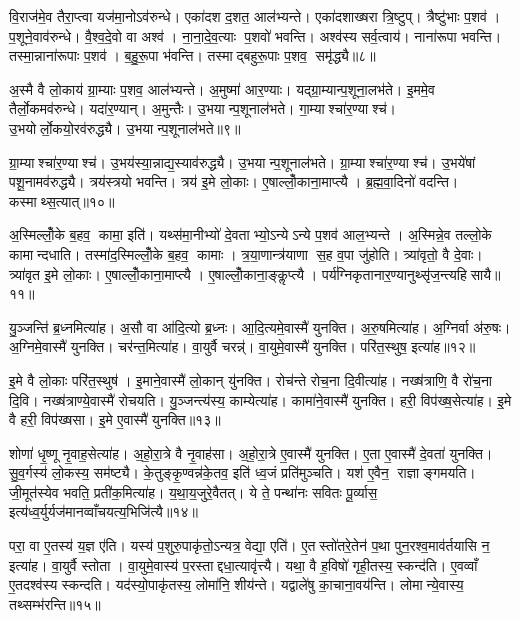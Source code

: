 वि॒राज॑मे॒व तैरा॒प्त्वा यज॑मा॒नोऽव॑रुन्धे। एका॑दश द॒शत॒ आल॑भ्यन्ते। एका॑दशाख्षरा त्रि॒ष्टुप्। त्रैष्टु॑भाः प॒शव॑। प॒शूने॒वाव॑रुन्धे। वै॒श्व॒दे॒वो वा अश्व॑। ना॒ना॒दे॒व॒त्याः प॒शवो॑ भवन्ति। अश्व॑स्य सर्व॒त्वाय॑। नाना॑रूपा भवन्ति। तस्मा॒न्नाना॑रूपाः प॒शव॑। ब॒हु॒रू॒पा भ॑वन्ति। तस्माद्बहुरू॒पाः प॒शव॒ समृ॑द्ध्यै॥८॥\anuvakamend[आ॒र॒ण्याल्लोँ॒को द॒शिन॑ आल॒भ्यन्ते॒ नाना॑रूपाः प॒शवो॒ द्वे च॑]

अ॒स्मै वै लो॒काय॑ ग्रा॒म्याः प॒शव॒ आल॑भ्यन्ते। अ॒मुष्मा॑ आर॒ण्याः। यद्ग्रा॒म्यान्प॒शूना॒लभ॑ते। इ॒ममे॒व तैर्लो॒कमव॑रुन्धे। यदा॑र॒ण्यान्। अ॒मुन्तैः। उ॒भयान्प॒शूनाल॑भते। गा॒म्याश्चा॑र॒ण्याश्च॑। उ॒भयोर्लो॒कयो॒रव॑रुद्ध्यै। उ॒भयान्प॒शूनाल॑भते॥९॥

ग्रा॒म्याश्चा॑र॒ण्याश्च॑। उ॒भय॑स्या॒न्नाद्य॒स्याव॑रुद्ध्यै। उ॒भयान्प॒शूनाल॑भते। ग्रा॒म्याश्चा॑र॒ण्याश्च॑। उ॒भये॑षां पशू॒नामव॑रुद्ध्यै। त्रय॑स्त्रयो भवन्ति। त्रय॑ इ॒मे लो॒काः। ए॒षाल्लोँ॒काना॒माप्त्यै। ब्र॒ह्म॒वा॒दिनो॑ वदन्ति। कस्माथ्स॒त्यात्॥१०॥

अ॒स्मिल्लोँ॒के ब॒हव॒ कामा॒ इति॑। यथ्स॑मा॒नीभ्यो॑ दे॒वताभ्यो॒ऽन्येऽन्ये प॒शव॑ आल॒भ्यन्ते। अ॒स्मिन्ने॒व तल्लो॒के कामान्दधाति। तस्मा॑द॒स्मिल्लोँ॒के ब॒हव॒ कामाः। त्र॒या॒णान्त्र॑याणा स॒ह व॒पा जु॑होति। त्र्या॑वृतो॒ वै दे॒वाः। त्र्या॑वृत इ॒मे लो॒काः। ए॒षाल्लोँ॒काना॒माप्त्यै। ए॒षाल्लोँ॒काना॒ङ्कॢप्त्यै। पर्य॑ग्निकृतानार॒ण्यानुथ्सृ॑ज॒न्त्यहिसायै॥११॥\anuvakamend[अव॑रुद्ध्या उ॒भयान्प॒शूनाल॑भते स॒त्यादहिसायै]

यु॒ञ्जन्ति॑ ब्र॒ध्नमित्या॑ह। अ॒सौ वा आ॑दि॒त्यो ब्र॒ध्नः। आ॒दि॒त्यमे॒वास्मै॑ युनक्ति। अ॒रु॒षमित्या॑ह। अ॒ग्निर्वा अ॑रु॒षः। अ॒ग्निमे॒वास्मै॑ युनक्ति। चर॑न्त॒मित्या॑ह। वा॒युर्वै चरन्न्॑। वा॒युमे॒वास्मै॑ युनक्ति। परि॑त॒स्थुष॒ इत्या॑ह॥१२॥

इ॒मे वै लो॒काः परि॑त॒स्थुष॑। इ॒माने॒वास्मै॑ लो॒कान् यु॑नक्ति। रोच॑न्ते रोच॒ना दि॒वीत्या॑ह। नख्ष॑त्राणि॒ वै रो॑च॒ना दि॒वि। नख्ष॑त्राण्ये॒वास्मै॑ रोचयति। यु॒ञ्जन्त्य॑स्य॒ काम्येत्या॑ह। कामा॑ने॒वास्मै॑ युनक्ति। हरी॒ विप॑ख्ष॒सेत्या॑ह। इ॒मे वै हरी॒ विप॑ख्षसा। इ॒मे ए॒वास्मै॑ युनक्ति॥१३॥

शोणा॑ धृ॒ष्णू नृ॒वाह॒सेत्या॑ह। अ॒हो॒रा॒त्रे वै नृ॒वाह॑सा। अ॒हो॒रा॒त्रे ए॒वास्मै॑ युनक्ति। ए॒ता ए॒वास्मै॑ दे॒वता॑ युनक्ति। सु॒व॒र्गस्य॑ लो॒कस्य॒ सम॑ष्ट्यै। के॒तुङ्कृ॒ण्वन्न॑के॒तव॒ इति॑ ध्व॒जं प्रति॑मुञ्चति। यश॑ ए॒वैन॒ राज्ञाङ्गमयति। जी॒मूत॑स्येव भवति॒ प्रती॑क॒मित्या॑ह। य॒था॒य॒जुरे॒वैतत्। ये ते॒ पन्था॑नः सवितः पू॒र्व्यास॒ इत्य॑ध्व॒र्युर्यज॑मानव्वाँचयत्य॒भिजि॑त्यै॥१४॥

परा॒ वा ए॒तस्य॑ य॒ज्ञ ए॑ति। यस्य॑ प॒शुरु॒पाकृ॑तो॒ऽन्यत्र॒ वेद्या॒ एति॑। ए॒तस्तो॑तरे॒तेन॑ प॒था पुन॒रश्व॒माव॑र्तयासि न॒ इत्या॑ह। वा॒युर्वै स्तोता। वा॒युमे॒वास्य॑ प॒रस्ताद्दधा॒त्यावृ॑त्त्यै। यथा॒ वै ह॒विषो॑ गृही॒तस्य॒ स्कन्द॑ति। ए॒वव्वाँ ए॒तदश्व॑स्य स्कन्दति। यद॑स्यो॒पाकृ॑तस्य॒ लोमा॑नि॒ शीय॑न्ते। यद्वाले॑षु का॒चाना॒वय॑न्ति। लोमान्ये॒वास्य॒ तथ्सम्भ॑रन्ति॥१५॥

